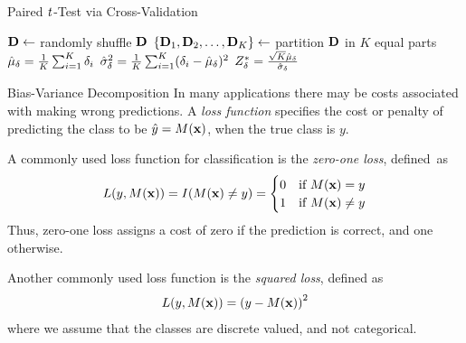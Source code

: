 \newcommand{\algpairedTtest}{\textsc{Paired $t$-Test}}
\begin{frame}[fragile]{Paired ${\it t}$-Test via Cross-Validation}
\begin{algorithm}[H]
\SetKwInOut{Algorithm}{\algpairedTtest ($\alpha$, $K$, $\bD$)}
\Algorithm{}
$\mathbf{D} \gets $ randomly shuffle $\bD$\;
$\{\mathbf{D}_1, \mathbf{D}_2, \ldots, \mathbf{D}_K\} \gets$ partition $\bD$ in $K$ equal parts\;
$\hat{\mu}_\delta = {1\over K} \sum_{i=1}^K \delta_i$\;
$\hat{\sigma}^2_\delta  = {1\over K} \sum_{i=1}^K (\delta_i - \hat{\mu}_\delta)^2$\;
$Z^*_\delta = {\sqrt{K} \hat{\mu}_\delta \over \hat{\sigma}_\delta}$\;
\end{algorithm}
\end{frame}


\begin{frame}{Bias-Variance Decomposition}
In many applications there may be costs associated with
making wrong predictions. A {\em loss function}
specif\/{i}es the cost or
penalty of predicting the class to be $\hat{y}=M(\mathbf{x})$,
when the true class is $y$.

\medskip
A commonly used loss function for classif\/{i}cation is the {\em zero-one
loss}, def\/{i}ned~as
\begin{align*}
  L(y, M(\mathbf{x})) = I(M(\mathbf{x}) \ne y) =
  \begin{cases}
    0 & \text{if } M(\mathbf{x})=y\\
  1 & \text{if } M(\mathbf{x}) \ne y
 \end{cases}
\end{align*}
Thus, zero-one loss assigns a cost of zero if the prediction is correct, and one otherwise.

\medskip
Another commonly used loss function is the {\em squared loss},
def\/{i}ned
as
\begin{align*}
  L(y, M(\mathbf{x})) = \left( y - M(\mathbf{x}) \right)^2
\end{align*}
where we assume that the classes are discrete valued, and not
categorical.
\end{frame}




